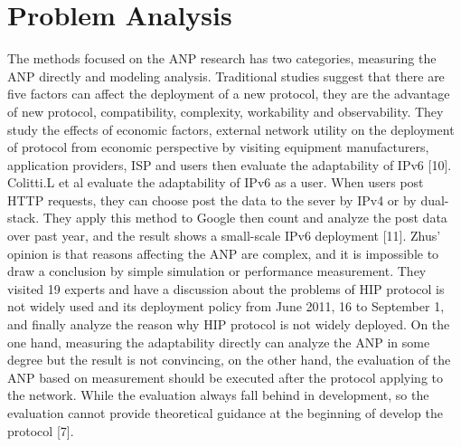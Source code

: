 \documentclass{article}
\begin{document}
\section{Problem Analysis}
The methods focused on the ANP research has two categories, measuring the ANP directly and modeling
analysis. Traditional studies suggest that there are five factors can affect the deployment of a new
protocol, they are the advantage of new protocol, compatibility, complexity, workability and observability.
They study the effects of economic factors, external network utility on the deployment of protocol
from economic perspective by visiting equipment manufacturers, application providers, ISP and users
then evaluate the adaptability of IPv6 [10]. Colitti.L et al evaluate the adaptability of IPv6 as a
user. When users post HTTP requests, they can choose post the data to the sever by IPv4 or by dual-stack.
They apply this method to Google then count and analyze the post data over past year, and the result
shows a small-scale IPv6 deployment [11]. Zhus' opinion is that reasons affecting the ANP are complex,
and it is impossible to draw a conclusion by simple simulation or performance measurement. They visited
19 experts and have a discussion about the problems of HIP protocol is not widely used and its deployment
policy from June 2011, 16 to September 1, and finally analyze the reason why HIP protocol is not widely
deployed. On the one hand, measuring the adaptability directly can analyze the ANP in some degree but
the result is not convincing, on the other hand, the evaluation of the ANP based on measurement should
be executed after the protocol applying to the network. While the evaluation always fall behind in development,
so the evaluation cannot provide theoretical guidance at the beginning of develop the protocol [7].
\end{document}
